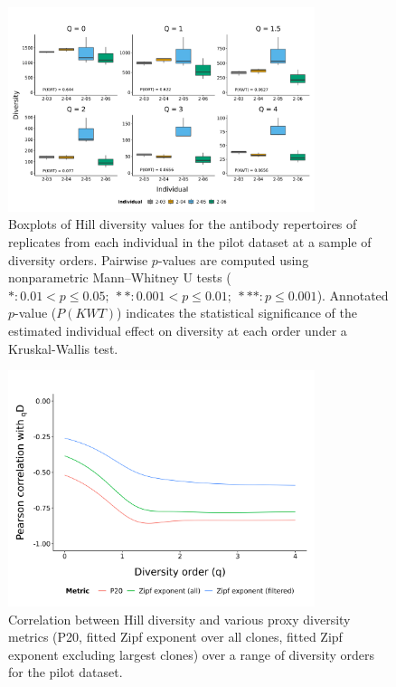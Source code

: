 
\begin{figure}
\centering
\includegraphics[width = 0.8\textwidth]{_Figures/png/pilot-clone-diversity-solo-box}
\caption{Boxplots of Hill diversity values for the antibody repertoires of replicates from each individual in the \igseq pilot dataset at a sample of diversity orders. Pairwise $p$-values are computed using nonparametric Mann–Whitney U tests ($*: 0.01 < p \leq 0.05;~**: 0.001 < p \leq 0.01;~***: p \leq 0.001$). Annotated $p$-value ($P(KWT)$) indicates the statistical significance of the estimated individual effect on diversity at each order under a Kruskal-Wallis test.} %
\label{fig:igseq-pilot-clone-diversity-solo-box}
\end{figure}

\begin{figure}
\centering
\includegraphics[width = 0.8\textwidth]{_Figures/png/pilot-clone-diversity-metrics-cor}
\caption{Correlation between Hill diversity and various proxy diversity metrics (P20, fitted Zipf exponent over all clones, fitted Zipf exponent excluding largest clones) over a range of diversity orders for the \igseq pilot dataset.}
\label{fig:igseq-pilot-clone-diversity-metrics-cor}
\end{figure}

